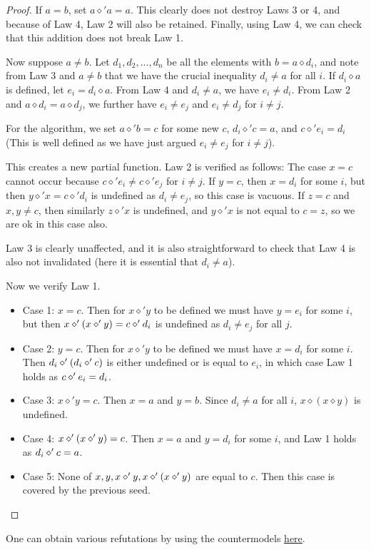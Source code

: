 \begin{proof}


If $a = b$, set $a \diamond' a = a$.  This clearly does not destroy Laws 3 or 4, and because of Law 4, Law 2 will also be retained.
Finally, using Law 4, we can check that this addition does not break Law 1.

Now suppose $a \neq b$.
Let $d_1,d_2,..., d_n$ be all the elements with $b = a \diamond d_i$, and note from Law 3 and $a \neq b $ that we have the crucial inequality $d_i \neq a$ for all $i$.  If $d_i \diamond a$ is defined, let $e_i = d_i \diamond a.$ From Law 4 and $d_i \neq a$, we have $e_i \neq d_i$. From Law 2 and $a \diamond d_i = a \diamond d_j$, we further have $e_i \neq e_j$ and $e_i \neq d_j$ for $i \neq j$.

 For the algorithm, we set $a \diamond' b = c$ for some new $c$, $d_i \diamond' c = a$, and $c \diamond' e_i = d_i$ (This is well defined as we have just argued $e_i \neq e_j$ for $i \neq j$).

This creates a new partial function.  Law 2 is verified as follows:
The case $x=c$ cannot occur because $c \diamond' e_i \neq c \diamond' e_j$ for $i \neq j$.
If $y=c$, then $x = d_i$ for some $i$, but then $y \diamond' x = c \diamond' d_i$ is undefined as $d_i \neq e_j$, so this case is vacuous.
If $z=c$ and $x,y \neq c$, then similarly $z \diamond' x$ is undefined, and $y \diamond' x$ is not equal to
$c = z$, so we are ok in this case also.

Law 3 is clearly unaffected, and it is also straightforward to check that Law 4 is also not invalidated
(here it is essential that $d_i \neq a$).

Now we verify Law 1.
\begin{itemize}
  \item Case 1: $x=c$.  Then for $x \diamond' y$ to be defined we must have $y=e_i$ for some $i$, but then
$x \diamond' (x \diamond' y) = c \diamond' d_i$ is undefined as $d_i \neq e_j$ for all $j$.
\item Case 2: $y=c$. Then for $x \diamond' y$ to be defined we must have $x = d_i$ for some $i$. Then $d_i \diamond' (d_i \diamond' c)$ is either undefined or is equal to $e_i$, in which case Law 1 holds as $c \diamond' e_i = d_i$.
\item Case 3: $x \diamond' y = c$.  Then $x=a$ and $y=b$.  Since $d_i \neq a$ for all $i$, $x \diamond (x \diamond y)$ is undefined.
\item Case 4: $x \diamond' (x \diamond' y) = c$. Then $x = a$ and $y = d_i$ for some $i$, and Law 1 holds as $d_i \diamond' c = a$.
\item Case 5: None of $x, y, x \diamond' y, x \diamond' (x \diamond' y)$ are equal to $c$.  Then this case is covered by the previous seed.
\end{itemize}
\end{proof}
One can obtain various refutations by using the countermodels \href{https://leanprover.zulipchat.com/#narrow/channel/458659-Equational/topic/713.2C.201289.2C.201447/near/483735768}{here}.


